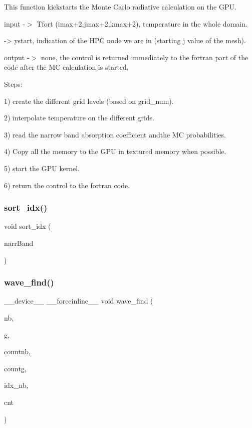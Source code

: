 This function kickstarts the Monte Carlo radiative calculation on the G\+PU.

input -\/$>$ Tfort (imax+2,jmax+2,kmax+2), temperature in the whole domain. \begin{DoxyVerb}  -> ystart, indication of the HPC node we are in (starting j value of the mesh).
\end{DoxyVerb}


output -\/$>$ none, the control is returned immediately to the fortran part of the code after the MC calculation is started.

Steps\+:

1) create the different grid levels (based on grid\+\_\+num).

2) interpolate temperature on the different grids.

3) read the narrow band absorption coefficient andthe MC probabilities.

4) Copy all the memory to the G\+PU in textured memory when possible.

5) start the G\+PU kernel.

6) return the control to the fortran code.\mbox{\label{mc__gpu_8cu_ad7499b86f24bd31ddd5cac176d8e88cb}} 
\subsubsection{\texorpdfstring{sort\+\_\+idx()}{sort\_idx()}}
{\footnotesize\ttfamily void sort\+\_\+idx (\begin{DoxyParamCaption}\item[{\hyperlink{classNarrowBand}{Narrow\+Band} $\ast$}]{narr\+Band }\end{DoxyParamCaption})}

\mbox{\label{mc__gpu_8cu_a2adfcce7b6d9986ea7ac4a40fa99b910}} 
\subsubsection{\texorpdfstring{wave\+\_\+find()}{wave\_find()}}
{\footnotesize\ttfamily \+\_\+\+\_\+device\+\_\+\+\_\+ \+\_\+\+\_\+forceinline\+\_\+\+\_\+ void wave\+\_\+find (\begin{DoxyParamCaption}\item[{int $\ast$}]{nb,  }\item[{int $\ast$}]{g,  }\item[{int $\ast$}]{countnb,  }\item[{int $\ast$}]{countg,  }\item[{int $\ast$}]{idx\+\_\+nb,  }\item[{\hyperlink{classCount}{Count} $\ast$}]{cnt }\end{DoxyParamCaption})}



